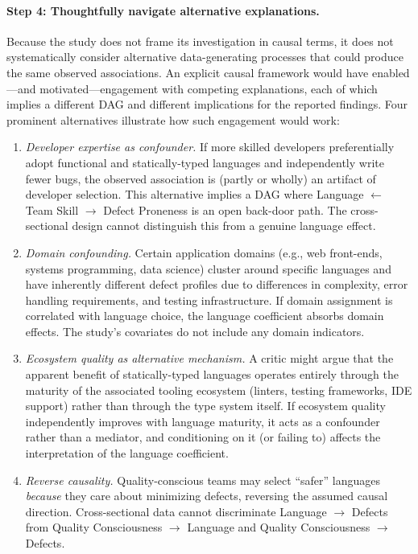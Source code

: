 \paragraph{Step 4: Thoughtfully navigate alternative explanations.}
Because the study does not frame its investigation in causal terms, it does not systematically consider alternative data-generating processes that could produce the same observed associations.
An explicit causal framework would have enabled---and motivated---engagement with competing explanations, each of which implies a different DAG and different implications for the reported findings.
Four prominent alternatives illustrate how such engagement would work:
\begin{enumerate}[leftmargin=15pt]
    \item \emph{Developer expertise as confounder.} If more skilled developers preferentially adopt functional and statically-typed languages and independently write fewer bugs, the observed association is (partly or wholly) an artifact of developer selection. This alternative implies a DAG where Language $\leftarrow$ Team Skill $\to$ Defect Proneness is an open back-door path. The cross-sectional design cannot distinguish this from a genuine language effect.
    
    \item \emph{Domain confounding.} Certain application domains (e.g., web front-ends, systems programming, data science) cluster around specific languages and have inherently different defect profiles due to differences in complexity, error handling requirements, and testing infrastructure. If domain assignment is correlated with language choice, the language coefficient absorbs domain effects. The study's covariates do not include any domain indicators.
    
    \item \emph{Ecosystem quality as alternative mechanism.} A critic might argue that the apparent benefit of statically-typed languages operates entirely through the maturity of the associated tooling ecosystem (linters, testing frameworks, IDE support) rather than through the type system itself. If ecosystem quality independently improves with language maturity, it acts as a confounder rather than a mediator, and conditioning on it (or failing to) affects the interpretation of the language coefficient.
    
    \item \emph{Reverse causality.} Quality-conscious teams may select ``safer'' languages \emph{because} they care about minimizing defects, reversing the assumed causal direction. Cross-sectional data cannot discriminate Language $\to$ Defects from Quality Consciousness $\to$ Language and Quality Consciousness $\to$ Defects.
\end{enumerate}

